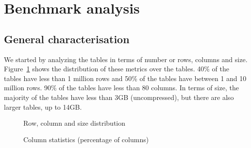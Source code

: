 \section{Benchmark analysis}
\label{sec:pbib:characterisation}

\subsection{General characterisation}

We started by analyzing the tables in terms of number or rows, columns and size. Figure~\ref{fig:pbib:generalstats} shows the distribution of these metrics over the tables. 40\% of the tables have less than 1 million rows and 50\% of the tables have between 1 and 10 million rows. 90\% of the tables have less than 80 columns. In terms of size, the majority of the tables have less than 3GB (uncompressed), but there are also larger tables, up to 14GB.

\begin{figure}[h]
\centering
{}
\caption{Row, column and size distribution}
\label{fig:pbib:generalstats}
\end{figure}

\begin{figure}[h]
\centering
{}
\caption{Column statistics (percentage of columns)}
\label{fig:pbib:columnstats}
\end{figure}

